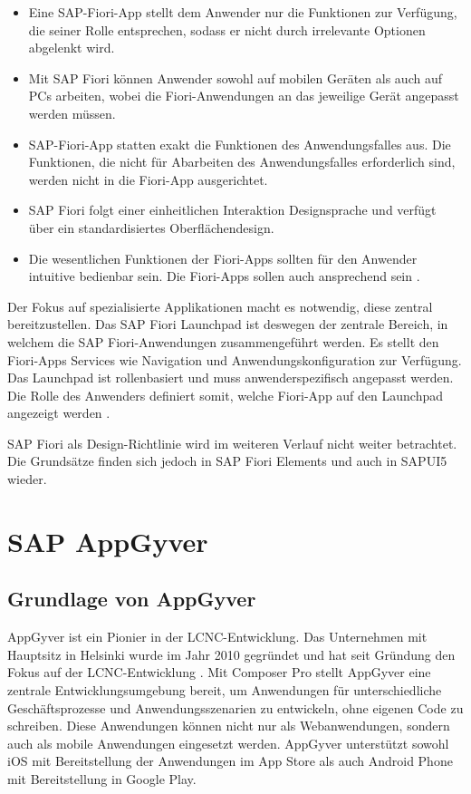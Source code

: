 \begin{itemize}[noitemsep]
\item Eine SAP-Fiori-App stellt dem Anwender nur die Funktionen zur Verfügung, die seiner Rolle entsprechen, sodass er nicht durch irrelevante Optionen abgelenkt wird.
\item Mit SAP Fiori können Anwender sowohl auf mobilen Geräten als auch auf PCs arbeiten, wobei die Fiori-Anwendungen an das jeweilige Gerät angepasst werden müssen.
\item SAP-Fiori-App statten exakt die Funktionen des Anwendungsfalles aus. Die Funktionen, die nicht für Abarbeiten des Anwendungsfalles erforderlich sind, werden nicht in die Fiori-App ausgerichtet.
\item SAP Fiori folgt einer einheitlichen Interaktion Designsprache und verfügt über ein standardisiertes Oberflächendesign.
\item Die wesentlichen Funktionen der Fiori-Apps sollten für den Anwender intuitive bedienbar sein. Die Fiori-Apps sollen auch ansprechend sein \cite[S.34-35]{fiori}.
\end{itemize}

Der Fokus auf spezialisierte Applikationen macht es notwendig, diese zentral bereitzustellen. Das SAP Fiori Launchpad ist deswegen der zentrale Bereich, in welchem die SAP Fiori-Anwendungen zusammengeführt werden. Es stellt den Fiori-Apps Services wie Navigation und Anwendungskonfiguration zur Verfügung. Das Launchpad ist rollenbasiert und muss anwenderspezifisch angepasst werden. Die Rolle des Anwenders definiert somit, welche Fiori-App auf den Launchpad angezeigt werden \cite{sap:fiorilp}.

SAP Fiori als Design-Richtlinie wird im weiteren Verlauf nicht weiter betrachtet. Die Grundsätze finden sich jedoch in SAP Fiori Elements und auch in SAPUI5 wieder.

\section{SAP AppGyver }
\subsection{Grundlage von AppGyver}

AppGyver ist ein Pionier in der LCNC-Entwicklung. Das Unternehmen mit Hauptsitz in Helsinki wurde im Jahr 2010 gegründet und hat seit Gründung den Fokus auf der LCNC-Entwicklung \cite{sap:lcnc}. Mit Composer Pro stellt AppGyver eine zentrale Entwicklungsumgebung bereit, um Anwendungen für unterschiedliche Geschäftsprozesse und Anwendungsszenarien zu entwickeln, ohne eigenen Code zu schreiben. Diese Anwendungen können nicht nur als Webanwendungen, sondern auch als mobile Anwendungen eingesetzt werden. AppGyver unterstützt sowohl iOS mit Bereitstellung der Anwendungen im App Store als auch Android Phone mit Bereitstellung in Google Play. 


